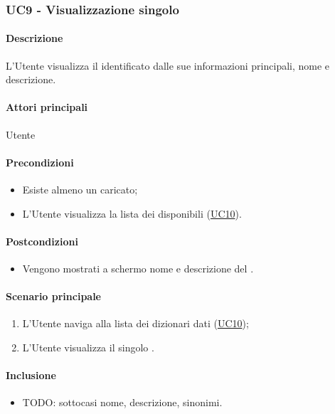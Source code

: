 \subsubsection{UC9 - Visualizzazione singolo }\label{UC9}
\paragraph*{Descrizione}
L’Utente visualizza il  identificato dalle sue informazioni principali, nome e descrizione.

\paragraph*{Attori principali}
Utente

\paragraph*{Precondizioni}
\begin{itemize}
  \item Esiste almeno un  caricato;
  \item L'Utente visualizza la lista dei  disponibili (\hyperref[UC10]{UC10}).
\end{itemize}

\paragraph*{Postcondizioni}
\begin{itemize}
  \item Vengono mostrati a schermo nome e descrizione del .
\end{itemize}

\paragraph*{Scenario principale}
\begin{enumerate}
  \item L’Utente naviga alla lista dei dizionari dati (\hyperref[UC10]{UC10});
  \item L’Utente visualizza il singolo .
\end{enumerate}

\paragraph*{Inclusione}
\begin{itemize}
  \item TODO: sottocasi nome, descrizione, sinonimi.
\end{itemize}
